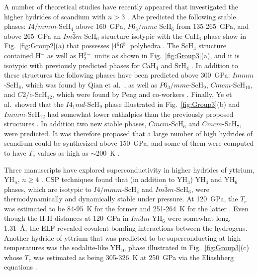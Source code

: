 \documentclass[12pt,letterpaper,oneside]{article}
\begin{document}
A number of theoretical studies have recently appeared that investigated the higher hydrides of scandium with $n>3$ \cite{Abe:Sc-2017,Qian:Sc-2017,Peng:Sc-2017,Zurek:2018b}. Abe predicted the following stable phases: $I4/mmm$-ScH$_4$ above 160~GPa, $P6_3/mmc$ ScH$_6$ from 135-265~GPa, and above 265~GPa an $Im\bar{3}m$-ScH$_6$ structure isotypic with the CaH$_6$ phase show in Fig.\ \ref{fig:Group2}(a) that possesses [4$^6$6$^{8}$] polyhedra \cite{Abe:Sc-2017}. The ScH$_4$ structure contained H$^-$ as well as H$_2^{\delta-}$ units as shown in Fig.\ \ref{fig:Group3}(a), and it is isotypic with previously predicted phases for CaH$_4$ \cite{Wang:2012} and SrH$_4$ \cite{Hooper:2013,Wang:2015a}. In addition to these structures the following phases have been predicted above 300~GPa: $Immm$-ScH$_8$, which was found by Qian et al.\ \cite{Qian:Sc-2017}, as well as $P6_3/mmc$-ScH$_9$, $Cmcm$-ScH$_{10}$, and $C2/c$-ScH$_{12}$, which were found by Peng and co-workers \cite{Peng:Sc-2017}. Finally, Ye et al.\ showed that the $I4_1md$-ScH$_9$ phase illustrated in Fig.\ \ref{fig:Group3}(b) and $Immm$-ScH$_{12}$ had somewhat lower enthalpies than the previously proposed structures \cite{Zurek:2018b}. In addition two new stable phases, $Cmcm$-ScH$_6$ and $Cmcm$-ScH$_7$, were predicted. It was therefore proposed that a large number of high hydrides of scandium could be synthesized above 150~GPa, and some of them were computed to have $T_c$ values as high as $\sim$200~K \cite{Peng:Sc-2017,Zurek:2018b}. 

Three manuscripts have explored superconductivity in higher hydrides of yttrium, YH$_n$, $n\ge4$ \cite{Li:2015a,Liu:2017-La-Y,Liu:2017-Y}. CSP techniques found that (in addition to YH$_3$)  YH$_4$ and YH$_6$ phases, which are isotypic to $I4/mmm$-ScH$_4$ and $Im\bar{3}m$-ScH$_6$, were thermodynamically and dynamically stable under pressure. At 120~GPa, the $T_c$ was estimated to be 84-95~K for the former and 251-264~K for the latter \cite{Li:2015a}. Even though the H-H distances at 120~GPa in $Im\bar{3}m$-YH$_6$ were somewhat long, 1.31~\AA{}, the ELF revealed covalent bonding interactions between the hydrogens.  
Another hydride of yttrium that was predicted to be superconducting at high temperatures was the sodalite-like YH$_{10}$ phase illustrated in Fig.\ \ref{fig:Group3}(c) whose $T_c$ was estimated as being 305-326~K at 250~GPa via the Eliashberg equations \cite{Liu:2017-La-Y}.  
\end{document}
